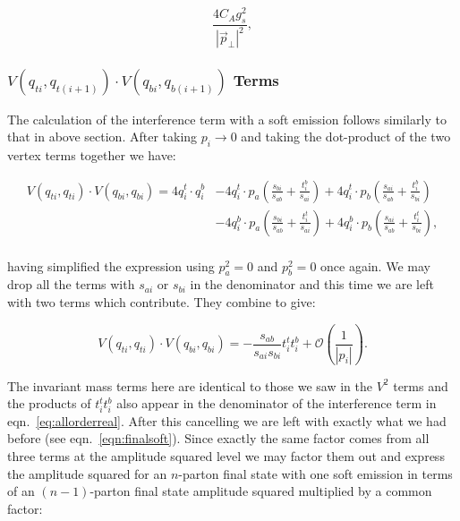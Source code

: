 			\begin{equation}
				\frac{4C_Ag_s^2}{|\vec{p}_\perp|^2},
				\label{eqn:finalsoft}
			\end{equation}

		\subsubsection{$V(q_{ti}, q_{t(i+1)})\cdot V(q_{bi}, q_{b(i+1)})$ Terms}
			\label{sub:subsection_name}

			The calculation of the interference term with a soft emission follows similarly to
			that in above section. After taking $p_i\rightarrow0$ and taking the dot-product of
			the two vertex terms together we have:

			\begin{equation}
			\begin{split}
				V(q_{ti}, q_{ti})\cdot V(q_{bi}, q_{bi}) =
				4q_i^t\cdot q_i^b &- 4q_i^t\cdot p_a\left(\frac{s_{bi}}{s_{ab}} +
				\frac{t_i^b}{s_{ai}}\right) + 4q_i^t\cdot p_b\left(\frac{s_{ai}}{s_{ab}} +
				\frac{t_i^b}{s_{bi}}\right)\\
				&- 4q_i^b\cdot p_a\left(\frac{s_{bi}}{s_{ab}} + \frac{t_i^t}{s_{ai}}\right) +
				4q_i^b\cdot p_b\left(\frac{s_{ai}}{s_{ab}} +
				\frac{t_i^t}{s_{bi}}\right),\\
			\end{split}
			\end{equation}

			having simplified the expression using $p_a^2=0$ and $p_b^2=0$ once again.  We may
			drop all the terms with $s_{ai}$ or $s_{bi}$ in the denominator and this time we are
			left with two terms which contribute.  They combine to give:

			\begin{equation}
				V(q_{ti}, q_{ti})\cdot V(q_{bi}, q_{bi}) = -\frac{s_{ab}}{s_{ai}s_{bi}}t_i^tt_i^b +
					\mathcal{O}\left(\frac{1}{|p_i|}\right).
			\end{equation}

			The invariant mass terms here are identical to those we saw in the $V^2$ terms and the products of
			$t_i^tt_i^b$ also appear in the denominator of the interference term in eqn.~\eqref{eq:allorderreal}.
			After this cancelling we are left with exactly what we had before (see eqn.~\eqref{eqn:finalsoft}).
			Since exactly the same factor comes from all three terms at the amplitude squared level we may factor
			them out and express the amplitude squared for an $n$-parton final state with one soft emission in
			terms of an $(n-1)$-parton final state amplitude squared multiplied by a common factor:

